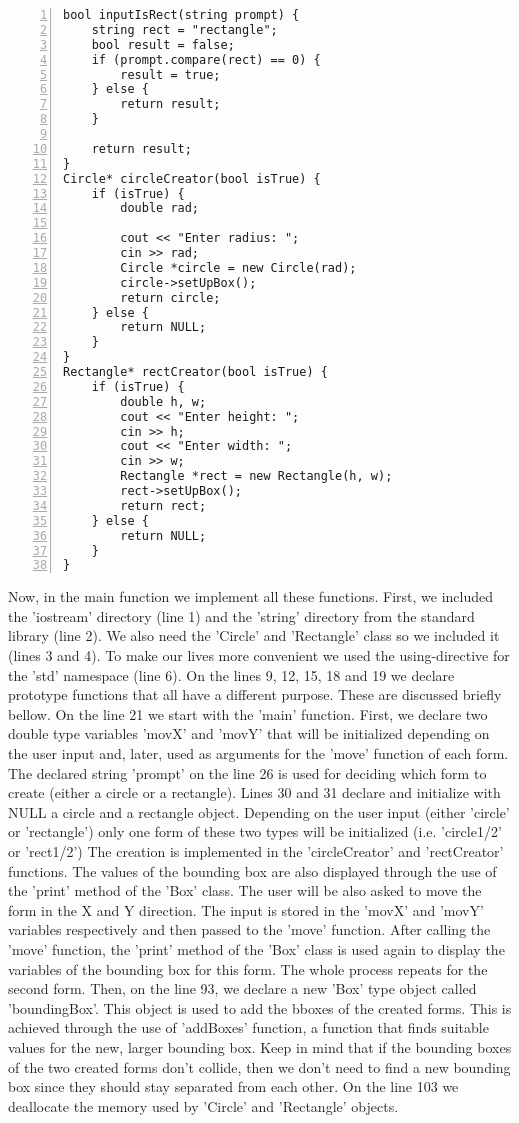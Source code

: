 \documentclass{article}
\begin{document}
\begin{lstlisting}[basicstyle=\footnotesize\ttfamily, numbers=left, stepnumber=1, numberstyle = \normalsize]
bool inputIsRect(string prompt) {
	string rect = "rectangle";
	bool result = false;
	if (prompt.compare(rect) == 0) {
		result = true; 
	} else {
		return result;
	}

	return result;
}
Circle* circleCreator(bool isTrue) {
	if (isTrue) {
		double rad;

		cout << "Enter radius: ";
		cin >> rad;
		Circle *circle = new Circle(rad);
		circle->setUpBox();
		return circle;
	} else {
		return NULL; 
	}
}
Rectangle* rectCreator(bool isTrue) {
	if (isTrue) {
		double h, w;
		cout << "Enter height: ";
		cin >> h;
		cout << "Enter width: ";
		cin >> w;
		Rectangle *rect = new Rectangle(h, w);
		rect->setUpBox();
		return rect; 
	} else {
		return NULL;
	}
}
\end{lstlisting}
\normalsize{
Now, in the main function we implement all these functions. First, we included the 'iostream' directory (line 1) and the 'string' directory from the standard library (line 2). 
We also need the 'Circle' and 'Rectangle' class so we included it (lines 3 and 4). To make our lives more convenient we used the using-directive for the 'std' namespace (line 6). 
On the lines 9, 12, 15, 18 and 19 we declare prototype functions that all have a different purpose. These are discussed briefly bellow.  
On the line 21 we start with the 'main' function. First, we declare two double type variables 'movX' and 'movY' that will be initialized depending on the user input and, later, used as arguments for the 'move' function of each form. 
The declared string 'prompt' on the line 26 is used for deciding which form to create (either a circle or a rectangle). 
Lines 30 and 31 declare and initialize with NULL a circle and a rectangle object.
Depending on the user input (either 'circle' or 'rectangle') only one form of these two types will be initialized (i.e. 'circle1/2' or 'rect1/2') 
The creation is implemented in the 'circleCreator' and 'rectCreator' functions. The values of the bounding box are also displayed through the use of the 'print' method of the 'Box' class.
The user will be also asked to move the form in the X and Y direction. The input is stored in the 'movX' and 'movY' variables respectively and then passed to the 'move' function. 
After calling the 'move' function, the 'print' method of the 'Box' class is used again to display the variables of the bounding box for this form.
The whole process repeats for the second form. 
Then, on the line 93, we declare a new 'Box' type object called 'boundingBox'. This object is used to add the bboxes of the created forms. This is achieved through the use of 'addBoxes' function, a function that finds suitable values for the new, larger bounding box. Keep in mind that if the bounding boxes of the two created forms don't collide, then we don't need to find a new bounding box since they should stay separated from each other.
On the line 103 we deallocate the memory used by 'Circle' and 'Rectangle' objects.
\newline 
}
\end{document}
